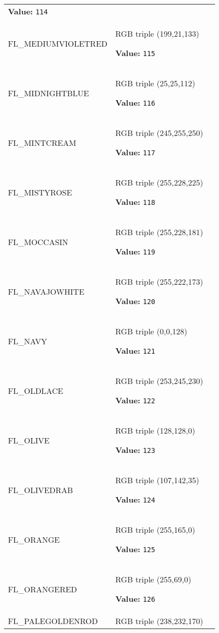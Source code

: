\begin{longtable}{|p{\varnamewidth}|p{\vardescrwidth}|l}
\textbf{Value:} 
{\tt 114}&\\
\cline{1-2}
\raggedright F\-L\-\_\-M\-E\-D\-I\-U\-M\-V\-I\-O\-L\-E\-T\-R\-E\-D\- & \raggedright RGB triple (199,21,133)

\textbf{Value:} 
{\tt 115}&\\
\cline{1-2}
\raggedright F\-L\-\_\-M\-I\-D\-N\-I\-G\-H\-T\-B\-L\-U\-E\- & \raggedright RGB triple (25,25,112)

\textbf{Value:} 
{\tt 116}&\\
\cline{1-2}
\raggedright F\-L\-\_\-M\-I\-N\-T\-C\-R\-E\-A\-M\- & \raggedright RGB triple (245,255,250)

\textbf{Value:} 
{\tt 117}&\\
\cline{1-2}
\raggedright F\-L\-\_\-M\-I\-S\-T\-Y\-R\-O\-S\-E\- & \raggedright RGB triple (255,228,225)

\textbf{Value:} 
{\tt 118}&\\
\cline{1-2}
\raggedright F\-L\-\_\-M\-O\-C\-C\-A\-S\-I\-N\- & \raggedright RGB triple (255,228,181)

\textbf{Value:} 
{\tt 119}&\\
\cline{1-2}
\raggedright F\-L\-\_\-N\-A\-V\-A\-J\-O\-W\-H\-I\-T\-E\- & \raggedright RGB triple (255,222,173)

\textbf{Value:} 
{\tt 120}&\\
\cline{1-2}
\raggedright F\-L\-\_\-N\-A\-V\-Y\- & \raggedright RGB triple (0,0,128)

\textbf{Value:} 
{\tt 121}&\\
\cline{1-2}
\raggedright F\-L\-\_\-O\-L\-D\-L\-A\-C\-E\- & \raggedright RGB triple (253,245,230)

\textbf{Value:} 
{\tt 122}&\\
\cline{1-2}
\raggedright F\-L\-\_\-O\-L\-I\-V\-E\- & \raggedright RGB triple (128,128,0)

\textbf{Value:} 
{\tt 123}&\\
\cline{1-2}
\raggedright F\-L\-\_\-O\-L\-I\-V\-E\-D\-R\-A\-B\- & \raggedright RGB triple (107,142,35)

\textbf{Value:} 
{\tt 124}&\\
\cline{1-2}
\raggedright F\-L\-\_\-O\-R\-A\-N\-G\-E\- & \raggedright RGB triple (255,165,0)

\textbf{Value:} 
{\tt 125}&\\
\cline{1-2}
\raggedright F\-L\-\_\-O\-R\-A\-N\-G\-E\-R\-E\-D\- & \raggedright RGB triple (255,69,0)

\textbf{Value:} 
{\tt 126}&\\
\cline{1-2}
\raggedright F\-L\-\_\-P\-A\-L\-E\-G\-O\-L\-D\-E\-N\-R\-O\-D\- & \raggedright RGB triple (238,232,170)


\end{longtable}
